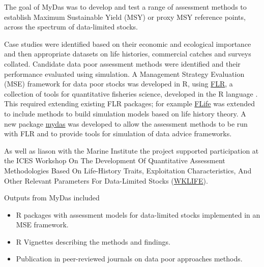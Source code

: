 
The goal of MyDas was to develop and test a range of assessment methods to establish Maximum Sustainable Yield (MSY) or proxy MSY reference points, across the spectrum of data-limited stocks. 

Case studies were identified based on their economic and ecological importance and then appropriate  datasets on life histories, commercial catches and surveys collated. Candidate data poor assessment methods were identified and their performance evaluated using simulation. A Management Strategy Evaluation (MSE) framework for data poor stocks was developed in R, using \href{http://www.flr-project.org/}{FLR}, a collection of tools for quantitative fisheries science, developed in the R language \citep{kell2007flr}. This required extending existing FLR packages; for example \href{https://github.com/flr/flife}{FLife} was extended to include methods to build simulation models based on life history theory. A new package \href{https://github.com/flr/mydas/wiki}{mydas} was developed to allow the assessment methods to be run with FLR and to provide tools for simulation of data advice frameworks.
 

As well as liason with the Marine Institute the project supported participation at the ICES Workshop On The Development Of Quantitative Assessment Methodologies Based On Life-History Traits, Exploitation Characteristics, And Other Relevant Parameters For Data-Limited Stocks (\href{https://www.ices.dk/community/groups/Pages/WKLIFEIX.aspx}{WKLIFE}).



Outputs from MyDas included

\begin{itemize}[noitemsep,topsep=0pt,parsep=0pt,partopsep=0pt]
 \item R packages with assessment models for data-limited stocks implemented in an MSE framework. 
 \item R Vignettes describing the methods and findings.
 \item Publication in peer-reviewed journals on data poor approaches methods.
\end{itemize}

